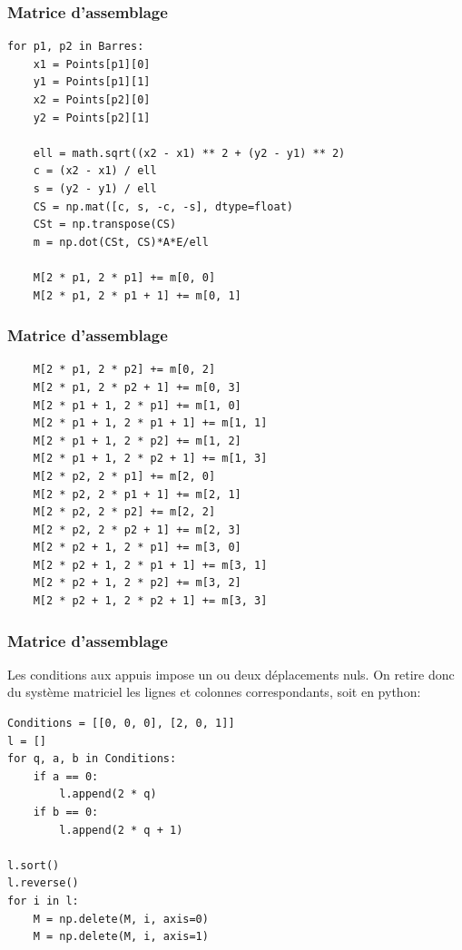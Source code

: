 \documentclass{beamer}
\begin{document}
\begin{frame}[fragile]
\frametitle{Matrice d'assemblage}
\begin{verbatim}
for p1, p2 in Barres:
    x1 = Points[p1][0]
    y1 = Points[p1][1]
    x2 = Points[p2][0]
    y2 = Points[p2][1]

    ell = math.sqrt((x2 - x1) ** 2 + (y2 - y1) ** 2)
    c = (x2 - x1) / ell
    s = (y2 - y1) / ell
    CS = np.mat([c, s, -c, -s], dtype=float)
    CSt = np.transpose(CS)
    m = np.dot(CSt, CS)*A*E/ell

    M[2 * p1, 2 * p1] += m[0, 0]
    M[2 * p1, 2 * p1 + 1] += m[0, 1]
\end{verbatim}
  \end{frame}

\begin{frame}[fragile]
\frametitle{Matrice d'assemblage}
\begin{verbatim}  
    M[2 * p1, 2 * p2] += m[0, 2]
    M[2 * p1, 2 * p2 + 1] += m[0, 3]
    M[2 * p1 + 1, 2 * p1] += m[1, 0]
    M[2 * p1 + 1, 2 * p1 + 1] += m[1, 1]
    M[2 * p1 + 1, 2 * p2] += m[1, 2]
    M[2 * p1 + 1, 2 * p2 + 1] += m[1, 3]
    M[2 * p2, 2 * p1] += m[2, 0]
    M[2 * p2, 2 * p1 + 1] += m[2, 1]
    M[2 * p2, 2 * p2] += m[2, 2]
    M[2 * p2, 2 * p2 + 1] += m[2, 3]
    M[2 * p2 + 1, 2 * p1] += m[3, 0]
    M[2 * p2 + 1, 2 * p1 + 1] += m[3, 1]
    M[2 * p2 + 1, 2 * p2] += m[3, 2]
    M[2 * p2 + 1, 2 * p2 + 1] += m[3, 3]
\end{verbatim}
\end{frame}

\begin{frame}[fragile]
\frametitle{Matrice d'assemblage}
Les conditions aux appuis impose un ou deux déplacements nuls. On retire donc du système matriciel  les lignes et colonnes correspondants, soit en python:

\begin{verbatim}
Conditions = [[0, 0, 0], [2, 0, 1]]
l = []
for q, a, b in Conditions:
    if a == 0:
        l.append(2 * q)
    if b == 0:
        l.append(2 * q + 1)

l.sort()
l.reverse()
for i in l:
    M = np.delete(M, i, axis=0)
    M = np.delete(M, i, axis=1)
\end{verbatim}


\end{frame}
\end{document}
